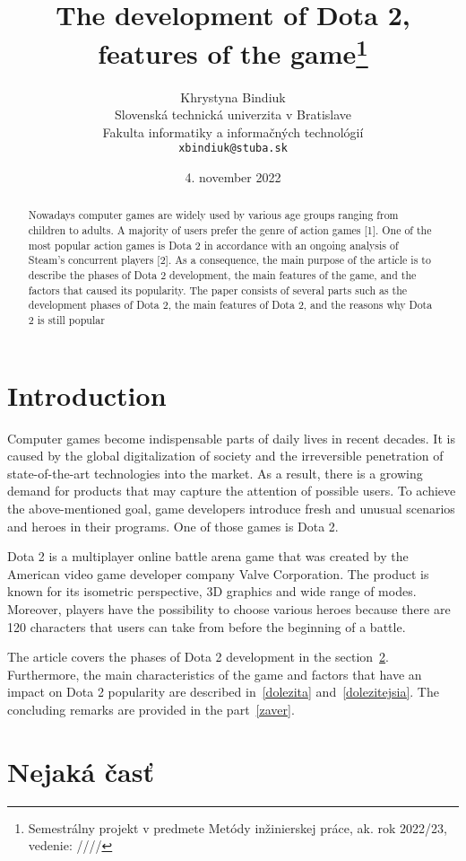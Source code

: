 \documentclass[10pt,twoside,slovak,a4paper]{article}
\title{The development of Dota 2, features of the game\thanks{Semestrálny projekt v predmete Metódy inžinierskej práce, ak. rok 2022/23, vedenie: //// }} %
\author{Khrystyna Bindiuk\\[2pt]
	{\small Slovenská technická univerzita v Bratislave}\\
	{\small Fakulta informatiky a informačných technológií}\\
	{\small \texttt{xbindiuk@stuba.sk}}
	}
\date{\small 4. november 2022} %
\begin{document}
\maketitle

\begin{abstract}

Nowadays computer games are widely used by various age groups ranging from children to adults. A majority of users prefer the genre of action games [1]. One of the most popular action games is Dota 2 in accordance with an ongoing analysis of Steam's concurrent players [2]. As a consequence, the main purpose of the article is to describe the phases of Dota 2 development, the main features of the game, and the factors that caused its popularity. The paper consists of several parts such as the development phases of Dota 2, the main features of Dota 2, and the reasons why Dota 2 is still popular
\end{abstract}



\section{Introduction}

Computer games become indispensable parts of daily lives in recent decades. It is caused by the global digitalization of society and the irreversible penetration of state-of-the-art technologies into the market. As a result, there is a growing demand for products that may capture the attention of possible users. To achieve the above-mentioned goal, game developers introduce fresh and unusual scenarios and heroes in their programs. One of those games is Dota 2. 

Dota 2 is a multiplayer online battle arena game that was created by the American video game developer company Valve Corporation. The product is known for its isometric perspective, 3D graphics and wide range of modes. Moreover, players have the possibility to choose various heroes because there are 120 characters that users can take from before the beginning of a battle.

The article covers the phases of Dota 2 development in the section~\ref{nejaka}. Furthermore, the main characteristics of the game and factors that have an impact on Dota 2 popularity are described in~\ref{dolezita} and~\ref{dolezitejsia}. The concluding remarks are provided in the part~\ref{zaver}.



\section{Nejaká časť} \label{nejaka}
\end{document}

